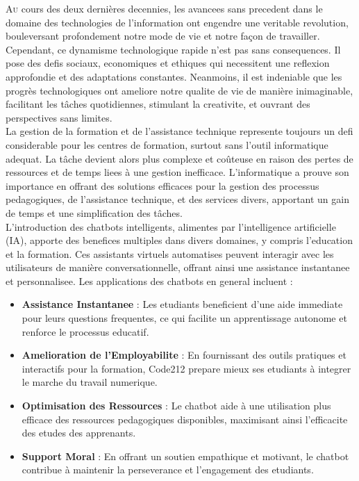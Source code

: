 \documentclass[a4paper, 11pt, openany]{report}
\begin{document}

\lettrine[nindent=0em, slope=-.5em]{\color{Eblue}A}{u} cours des deux dernières decennies, les avancees sans precedent dans le domaine des technologies de l'information ont engendre une veritable revolution, bouleversant profondement notre mode de vie et notre façon de travailler. Cependant, ce dynamisme technologique rapide n'est pas sans consequences. Il pose des defis sociaux, economiques et ethiques qui necessitent une reflexion approfondie et des adaptations constantes. Neanmoins, il est indeniable que les progrès technologiques ont ameliore notre qualite de vie de manière inimaginable, facilitant les tâches quotidiennes, stimulant la creativite, et ouvrant des perspectives sans limites.
\\

La gestion de la formation et de l'assistance technique represente toujours un defi considerable pour les centres de formation, surtout sans l’outil informatique adequat. La tâche devient alors plus complexe et coûteuse en raison des pertes de ressources et de temps liees à une gestion inefficace. L’informatique a prouve son importance en offrant des solutions efficaces pour la gestion des processus pedagogiques, de l’assistance technique, et des services divers, apportant un gain de temps et une simplification des tâches.
\\
L'introduction des chatbots intelligents, alimentes par l'intelligence artificielle (IA), apporte des benefices multiples dans divers domaines, y compris l'education et la formation. Ces assistants virtuels automatises peuvent interagir avec les utilisateurs de manière conversationnelle, offrant ainsi une assistance instantanee et personnalisee. Les applications des chatbots en general incluent :
\begin{itemize}
    \item \textbf{Assistance Instantanee} : Les etudiants beneficient d'une aide immediate pour leurs questions frequentes, ce qui facilite un apprentissage autonome et renforce le processus educatif.
    \item \textbf{Amelioration de l'Employabilite} : En fournissant des outils pratiques et interactifs pour la formation, Code212 prepare mieux ses etudiants à integrer le marche du travail numerique.
    \item \textbf{Optimisation des Ressources} : Le chatbot aide à une utilisation plus efficace des ressources pedagogiques disponibles, maximisant ainsi l'efficacite des etudes des apprenants.
    \item \textbf{Support Moral} : En offrant un soutien empathique et motivant, le chatbot contribue à maintenir la perseverance et l'engagement des etudiants.
\end{itemize}
\ \\
\end{document}
